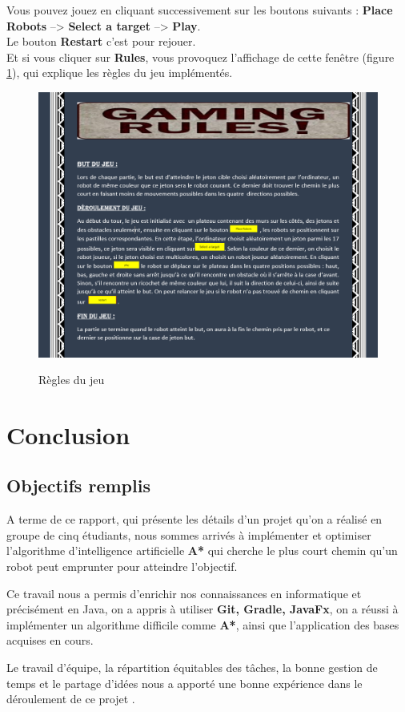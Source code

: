 \documentclass[12pt, a4paper, openany]{article}
\begin{document}
Vous pouvez jouez en cliquant successivement sur les boutons suivants : \textbf{Place Robots} --> \textbf{Select a target } --> \textbf{Play}.
\\Le bouton \textbf{Restart} c'est pour rejouer.\\
Et si vous cliquer sur \textbf{Rules}, vous provoquez l'affichage de cette fenêtre (figure \ref{fig:Rules}), qui explique les règles du jeu implémentés. 
\begin{figure}[H]
\begin{center}
 \includegraphics[scale=0.5]{rules.png}
    \\[1cm] 
       
\end{center}  
\caption{Règles du jeu } 
\label{fig:Rules}
\end{figure}



\section{Conclusion}
\subsection{Objectifs remplis}
A terme de ce rapport, qui présente les détails d’un projet qu’on a réalisé en groupe de cinq étudiants, nous sommes arrivés à implémenter et optimiser  l’algorithme d’intelligence artificielle \textbf{A*} qui cherche le plus court chemin qu'un robot peut emprunter pour atteindre l'objectif.
\par
Ce travail nous a permis d’enrichir nos connaissances en informatique et précisément en Java, on a appris à  utiliser \textbf{Git, Gradle, JavaFx}, on a réussi à implémenter un algorithme difficile comme \textbf{A*}, ainsi que l’application des bases acquises en cours.
\par
Le travail d’équipe, la répartition équitables des tâches, la bonne gestion de temps et le partage d’idées nous a apporté une bonne expérience dans le déroulement de ce projet  .
\end{document}
